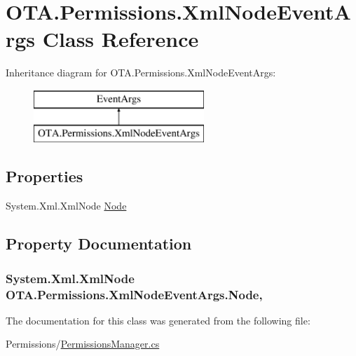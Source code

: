 \hypertarget{class_o_t_a_1_1_permissions_1_1_xml_node_event_args}{}\section{O\+T\+A.\+Permissions.\+Xml\+Node\+Event\+Args Class Reference}
\label{class_o_t_a_1_1_permissions_1_1_xml_node_event_args}
Inheritance diagram for O\+T\+A.\+Permissions.\+Xml\+Node\+Event\+Args\+:\begin{figure}[H]
\begin{center}
\leavevmode
\includegraphics[height=2.000000cm]{class_o_t_a_1_1_permissions_1_1_xml_node_event_args}
\end{center}
\end{figure}
\subsection*{Properties}
\begin{DoxyCompactItemize}
\item 
System.\+Xml.\+Xml\+Node \hyperlink{class_o_t_a_1_1_permissions_1_1_xml_node_event_args_a1629c30862d449a6fff78efcd5f66c53}{Node}
\end{DoxyCompactItemize}


\subsection{Property Documentation}
\hypertarget{class_o_t_a_1_1_permissions_1_1_xml_node_event_args_a1629c30862d449a6fff78efcd5f66c53}{}
\subsubsection[{Node}]{\setlength{\rightskip}{0pt plus 5cm}System.\+Xml.\+Xml\+Node O\+T\+A.\+Permissions.\+Xml\+Node\+Event\+Args.\+Node\hspace{0.3cm}{\ttfamily [get]}, {\ttfamily [set]}}\label{class_o_t_a_1_1_permissions_1_1_xml_node_event_args_a1629c30862d449a6fff78efcd5f66c53}


The documentation for this class was generated from the following file\+:\begin{DoxyCompactItemize}
\item 
Permissions/\hyperlink{_permissions_manager_8cs}{Permissions\+Manager.\+cs}\end{DoxyCompactItemize}
